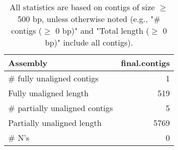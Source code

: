 \documentclass[12pt,a4paper]{article}
\begin{document}
\begin{table}[ht]
\begin{center}
\caption{All statistics are based on contigs of size $\geq$ 500 bp, unless otherwise noted (e.g., "\# contigs ($\geq$ 0 bp)" and "Total length ($\geq$ 0 bp)" include all contigs).}
\begin{tabular}{|l*{1}{|r}|}
\hline
Assembly & final.contigs \\ \hline
\# fully unaligned contigs & 1 \\ \hline
Fully unaligned length & 519 \\ \hline
\# partially unaligned contigs & 5 \\ \hline
Partially unaligned length & 5769 \\ \hline
\# N's & 0 \\ \hline
\end{tabular}
\end{center}
\end{table}
\end{document}
